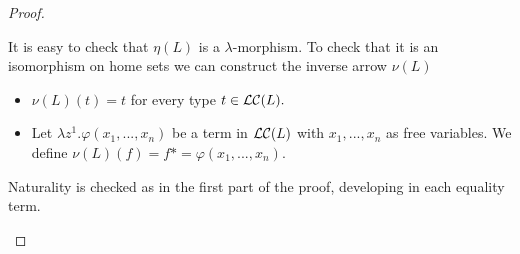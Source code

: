 \begin{proof}
\begin{enumerate}
    It is easy to check that $\eta(L)$ is a $\lambda$-morphism. To check that it is an isomorphism on home sets we can construct the inverse arrow $\nu(L)$

    \begin{itemize}
    \item  $\nu(L)(t) = t$ for every type $t \in \mathcal{L}\mathcal{C}(L).$
    \item  Let $\lambda z^1.\varphi(x_1,...,x_n)$ be a term in $\mathcal{L}\mathcal{C}(L)$ with $x_1,...,x_n$ as free variables. We define $\nu(L)(f)= f* = \varphi(x_1,...,x_n)$.  
    \end{itemize}

    Naturality is checked as in the first part of the proof, developing in each equality term. 
  \end{enumerate}
\end{proof}







